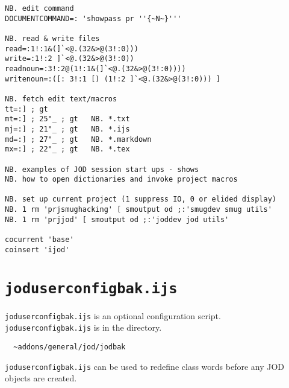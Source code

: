 \begin{lstlisting}[frame=single,framerule=0pt,basicstyle=\ttfamily\footnotesize]
NB. edit command 
DOCUMENTCOMMAND=: 'showpass pr ''{~N~}'''

NB. read & write files
read=:1!:1&(]`<@.(32&>@(3!:0)))
write=:1!:2 ]`<@.(32&>@(3!:0))
readnoun=:3!:2@(1!:1&(]`<@.(32&>@(3!:0))))
writenoun=:([: 3!:1 [) (1!:2 ]`<@.(32&>@(3!:0))) ]

NB. fetch edit text/macros
tt=:] ; gt
mt=:] ; 25"_ ; gt   NB. *.txt
mj=:] ; 21"_ ; gt   NB. *.ijs
md=:] ; 27"_ ; gt   NB. *.markdown
mx=:] ; 22"_ ; gt   NB. *.tex

NB. examples of JOD session start ups - shows
NB. how to open dictionaries and invoke project macros

NB. set up current project (1 suppress IO, 0 or elided display)
NB. 1 rm 'prjsmughacking' [ smoutput od ;:'smugdev smug utils'
NB. 1 rm 'prjjod' [ smoutput od ;:'joddev jod utils'

cocurrent 'base'
coinsert 'ijod'
\end{lstlisting}

   \newpage
   \section{\texttt{joduserconfigbak.ijs}}\label{ap:jodusercfgbak}
   
\verb|joduserconfigbak.ijs| is an optional configuration 
script. \verb|joduserconfigbak.ijs| is in the directory.
\begin{verbatim}
  ~addons/general/jod/jodbak
\end{verbatim}
\verb|joduserconfigbak.ijs| can be used to redefine class words before
any JOD objects are created. 
   
